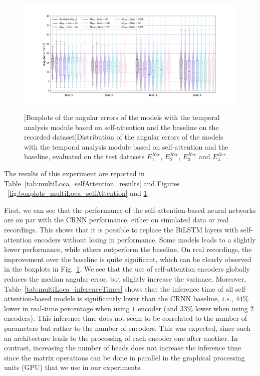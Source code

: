 \begin{figure}[t]
    \centering
    \begin{adjustbox}{width=1.3\textwidth,center}
        \includegraphics[width=1.\textwidth]{Images/chap7/boxplots_selfAttention_locata.png}
    \end{adjustbox}
    
    [Boxplots of the angular errors of the models with the temporal analysis module based on self-attention and the baseline on the recorded dataset]{Distribution of the angular errors of the models with the temporal analysis module based on self-attention and the baseline, evaluated on the test datasets $E^{Rec}_1$, $E^{Rec}_2$, $E^{Rec}_3$ and $E^{Rec}_4$.}
    \label{fig:boxplots_multiLoca_selfAttention_locata}
\end{figure}

The results of this experiment are reported in Table~\ref{tab:multiLoca_selfAttention_results} and Figures ~\ref{fig:boxplots_multiLoca_selfAttention} and \ref{fig:boxplots_multiLoca_selfAttention_locata}. 

First, we can see that the performance of the self-attention-based neural networks are on par with the CRNN performance, either on simulated data or real recordings. This shows that it is possible to replace the BiLSTM layers with self-attention encoders without losing in performance. Some models leads to a slightly lower performance, while others outperform the baseline. On real recordings, the improvement over the baseline is quite significant, which can be clearly observed in the boxplots in Fig.~\ref{fig:boxplots_multiLoca_selfAttention_locata}. We see that the use of self-attention encoders globally reduces the median angular error, but slightly increase the variance. Moreover, Table~\ref{tab:multiLoca_inferenceTimes} shows that the inference time of all self-attention-based models is significantly lower than the CRNN baseline, \emph{i.e.}, $44$\% lower in real-time percentage when using $1$ encoder (and $33$\% lower when using 2 encoders). This inference time does not seem to be correlated to the number of parameters but rather to the number of encoders. This was expected, since such an architecture leads to the processing of each encoder one after another. In contrast, increasing the number of heads does not increase the inference time since the matrix operations can be done in parallel in the graphical processing units (GPU) that we use in our experiments.

